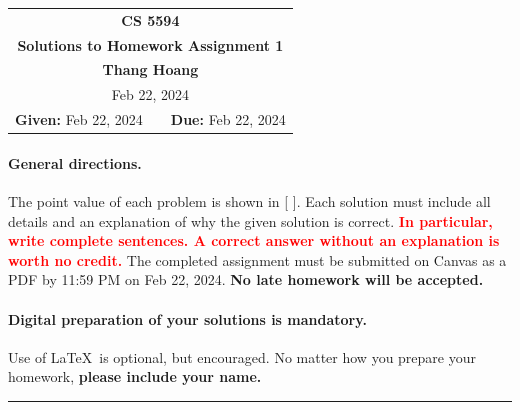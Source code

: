 \documentclass[10pt,twoside]{article}
\newcommand{\coursenumber}{CS 5594}
\newcommand{\docdate}{Feb 09, 2024}
\newcommand{\duedate}{Feb 22, 2024}
\newcommand{\homeworknumber}{1}
\newcommand{\doctitle}{Solutions to Homework Assignment \homeworknumber}
\newcommand{\doctitle}{Homework Assignment \homeworknumber}
\renewcommand{\docdate}{\duedate}
\renewcommand{\author}{Thang Hoang}
\newcounter{problem}
\newcommand{\problembreak}{\bigskip\hrule\bigskip}
\begin{document}
	
	\thispagestyle{empty}
	
	\begin{center}
		\begin{tabular}{lcr}
			\multicolumn{3}{c}{\Large\textbf{\coursenumber}}
			\\[0.04in]
			\multicolumn{3}{c}{\Large\textbf{\doctitle}}
			\ifthenelse{\boolean{solutions}}{%
				\\[0.04in]\multicolumn{3}{c}{\large\textbf{\author}}
			}{} %
			\ifthenelse{\boolean{solutions}}{%
				\\[0.10in]\multicolumn{3}{c}{\duedate}
			}{%
				\\[0.10in]
				\textbf{Given:} \docdate
				& \hspace*{1.0in} &
				\textbf{Due:} \duedate
			}
		\end{tabular}
	\end{center}
	
	{
		\begingroup %
		\paragraph{General directions.}
		The point value of each problem is shown in [ ].
		Each solution must include all details and
		an explanation of why the given solution is correct.
		\textbf{\textcolor{red}{In particular,
				write complete sentences.
				A correct answer without an explanation is worth no credit.}}
		The completed assignment must be submitted on Canvas as a PDF by 11:59 PM
		on \duedate.
		\textbf{No late homework will be accepted.}
		
		\paragraph{Digital preparation of your solutions is mandatory.}
		Use of \LaTeX\ is optional, but encouraged.
		No matter how you prepare your homework,
		\textbf{please include your name.}
		
		
		\problembreak
		
		\newpage
		
	}
	
\end{document}
